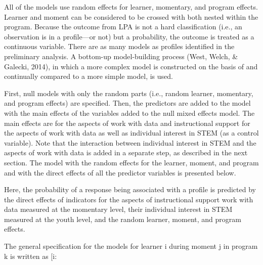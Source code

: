 \documentclass[]{msu-thesis}
\theoremstyle{definition}
\theoremstyle{definition}
\theoremstyle{definition}
\theoremstyle{remark}
\begin{document}
All of the models use random effects for learner, momentary, and program
effects. Learner and moment can be considered to be crossed with both
nested within the program. Because the outcome from LPA is not a hard
classification (i.e., an observation is in a profile---or not) but a
probability, the outcome is treated as a continuous variable. There are
as many models as profiles identified in the preliminary analysis. A
bottom-up model-building process (West, Welch, \& Galecki, 2014), in
which a more complex model is constructed on the basis of and
continually compared to a more simple model, is used.

First, null models with only the random parts (i.e., random learner,
momentary, and program effects) are specified. Then, the predictors are
added to the model with the main effects of the variables added to the
null mixed effects model. The main effects are for the aspects of work
with data and instructional support for the aspects of work with data as
well as individual interest in STEM (as a control variable). Note that
the interaction between individual interest in STEM and the aspects of
work with data is added in a separate step, as described in the next
section. The model with the random effects for the learner, moment, and
program and with the direct effects of all the predictor variables is
presented below.

Here, the probability of a response being associated with a profile is
predicted by the direct effects of indicators for the aspects of
instructional support work with data measured at the momentary level,
their individual interest in STEM measured at the youth level, and the
random learner, moment, and program effects.

The general specification for the models for learner i during moment j
in program k is written as {[}i:
\end{document}
